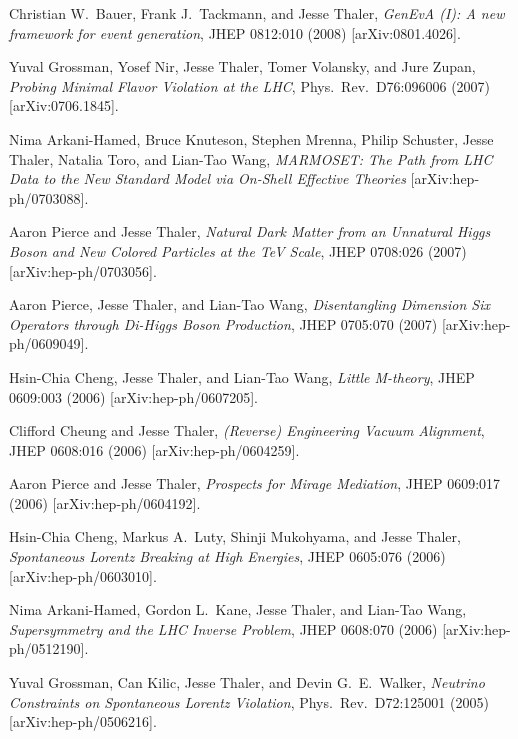 \begin{list}{[]\addtocounter{jessecount}{-1}}{\leftmargin=3em \itemsep=4pt}
\item
 Christian W.\ Bauer, Frank J.\ Tackmann, and Jesse Thaler,
\emph{GenEvA (I): A new framework for event generation},
JHEP 0812:010 (2008)
[arXiv:0801.4026].

\item
 Yuval Grossman, Yosef Nir, Jesse Thaler, Tomer Volansky, and Jure Zupan,
\emph{Probing Minimal Flavor Violation at the LHC},
Phys.\ Rev.\ D76:096006 (2007)
[arXiv:0706.1845].

\item
 Nima Arkani-Hamed, Bruce Knuteson, Stephen Mrenna, Philip Schuster, Jesse Thaler, Natalia Toro, and Lian-Tao Wang,
\emph{MARMOSET: The Path from LHC Data to the New Standard Model via On-Shell Effective Theories}
[arXiv:hep-ph/0703088].

\item
 Aaron Pierce and Jesse Thaler,
\emph{Natural Dark Matter from an Unnatural Higgs Boson and New Colored Particles at the TeV Scale},
JHEP 0708:026 (2007)
[arXiv:hep-ph/0703056].

\item
 Aaron Pierce, Jesse Thaler, and Lian-Tao Wang,
\emph{Disentangling Dimension Six Operators through Di-Higgs Boson Production},
JHEP 0705:070 (2007)
[arXiv:hep-ph/0609049].

\item
 Hsin-Chia Cheng, Jesse Thaler, and Lian-Tao Wang,
\emph{Little M-theory},
JHEP 0609:003 (2006)
[arXiv:hep-ph/0607205].

\item
 Clifford Cheung and Jesse Thaler,
\emph{(Reverse) Engineering Vacuum Alignment},
JHEP 0608:016 (2006)
[arXiv:hep-ph/0604259].

\item
 Aaron Pierce and Jesse Thaler,
\emph{Prospects for Mirage Mediation},
JHEP 0609:017 (2006)
[arXiv:hep-ph/0604192].

\item
 Hsin-Chia Cheng, Markus A.\ Luty, Shinji Mukohyama, and Jesse Thaler,
\emph{Spontaneous Lorentz Breaking at High Energies},
JHEP 0605:076 (2006)
[arXiv:hep-ph/0603010].

\item
 Nima Arkani-Hamed, Gordon L.\ Kane, Jesse Thaler, and Lian-Tao Wang,
\emph{Supersymmetry and the LHC Inverse Problem},
JHEP 0608:070 (2006)
[arXiv:hep-ph/0512190].

\item
 Yuval Grossman, Can Kilic, Jesse Thaler, and Devin G.\ E.\ Walker,
\emph{Neutrino Constraints on Spontaneous Lorentz Violation},
Phys.\ Rev.\ D72:125001 (2005)
[arXiv:hep-ph/0506216].


\end{list}
